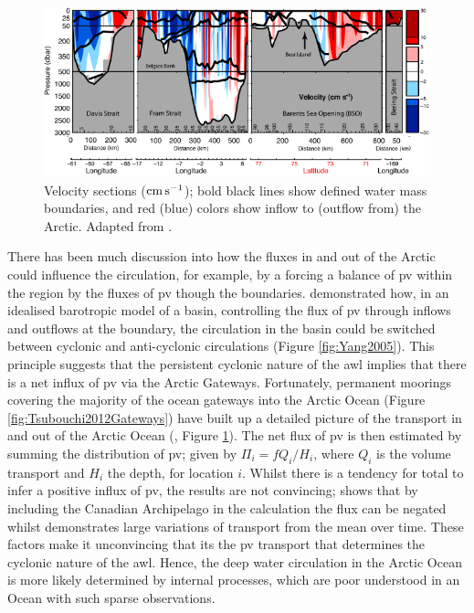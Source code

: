 \documentclass[10pt,a4paper]{article}
\begin{document}
\begin{figure}
	\centering
	\includegraphics[width=\linewidth]{Tsubouchi2012Transport}
	\caption[Adapted from \cite{tsubouchi2012arctic}]{Velocity
		sections (${\rm cm} \, {\rm s}^{-1}$); bold black lines show defined water mass boundaries, and red (blue) colors show inflow
		to (outflow from) the Arctic.  Adapted from \cite{tsubouchi2012arctic}.}
	\label{fig:Tsubouchi2012Transport}
\end{figure}

There has been much discussion
into how the fluxes in and out of the Arctic could influence the circulation,
for example, by a forcing a balance of \gls{pv} within the region by
the fluxes of \gls{pv} though the boundaries. \cite{yang2005arctic} demonstrated how,
in an idealised barotropic model of a basin, controlling the flux 
of \gls{pv} through inflows and outflows
at the boundary, the circulation in the basin could be switched between cyclonic and
anti-cyclonic circulations (Figure \ref{fig:Yang2005}). This principle suggests
that the persistent cyclonic nature of the \gls{awl} implies that there is a 
net influx of \gls{pv} via the Arctic Gateways. Fortunately, permanent moorings 
covering the majority of the ocean gateways into the Arctic Ocean (Figure
\ref{fig:Tsubouchi2012Gateways}) have built
up a detailed picture of the transport in and out of the Arctic Ocean 
(\cite{tsubouchi2012arctic}, Figure \ref{fig:Tsubouchi2012Transport}). The net flux of \gls{pv} is then estimated by summing the distribution of \gls{pv}; given by $ \Pi_{i} = fQ_{i}/H_{i}$,
where $Q_{i}$ is the volume transport and $H_i$ the depth, for location $i$. 
Whilst there is a tendency for total to infer a positive influx of \gls{pv}, the
results are not convincing; \cite{munchow2006observational} shows that by including the
Canadian Archipelago in the \cite{yang2005arctic} calculation the flux can be negated whilst
\cite{tsubouchi2012arctic} demonstrates large variations of transport from the mean over time.
These factors make it unconvincing that its the \gls{pv} transport that determines the 
cyclonic nature of the \gls{awl}.
Hence, the deep water circulation in the Arctic Ocean is more likely determined by 
internal processes, which are poor understood in an Ocean with such sparse observations.
\end{document}

